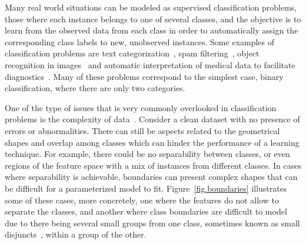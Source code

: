 \documentclass[
	fontsize=11pt, %
	twoside=false, %
	open=any, %
	secnumdepth=1, %
]{kaobook}
\newcommand{\rechange}[1]{{\color{blue}#1}}
\renewcommand{\rechange}[1]{#1}
\begin{document}
Many real world situations can be modeled as supervised classification problems, those where each instance belongs to one of several classes, and the objective is to learn from the observed data from each class in order to automatically assign the corresponding class labels to new, unobserved instances. Some examples of classification problems are text categorization~\cite{Yang1999ARO}, spam filtering~\cite{Dada2019MachineLF}, object recognition in images~\cite{Russakovsky2015ImageNetLS} and automatic interpretation of medical data to facilitate diagnostics~\cite{deo2015machine}. \rechange{Many of these problems correspond to the simplest case, binary classification, where there are only two categories.}

One of the type of issues that is very commonly overlooked in classification problems is the complexity of data~\cite{ho2000measuring,lorena2019complex}. Consider a clean dataset with no presence of errors or abnormalities. There can still be aspects related to the geometrical shapes and overlap among classes which can hinder the performance of a learning technique. For example, there could be no separability between classes, or even regions of the feature space with a mix of instances from different classes. In cases where separability is achievable, boundaries can present complex shapes that can be difficult for a parameterized model to fit. Figure~\ref{fig.boundaries} illustrates some of these cases, more concretely, one where the features do not allow to separate the classes, and another where class boundaries are difficult to model due to there being several small groups from one class, sometimes known as small disjuncts~\cite{weiss1995learning},  within a group of the other.
\end{document}
